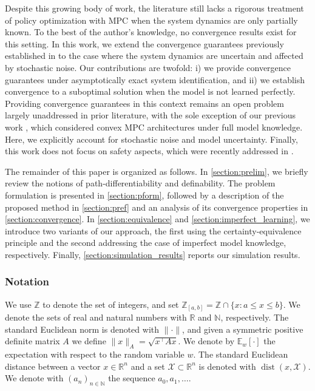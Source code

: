\documentclass[journal,twoside,web,final]{ieeecolor}
\theoremstyle{definition}
\newcommand{\R}{\mathbb{R}}
\newcommand{\Z}{\mathbb{Z}}
\newcommand{\N}{\mathbb{N}}
\begin{document}
Despite this growing body of work, the literature still lacks a rigorous treatment of policy optimization with MPC when the system dynamics are only partially known. To the best of the author's knowledge, no convergence results exist for this setting.
In this work, we extend the convergence guarantees previously established in \cite{zuliani2023bp} to the case where the system dynamics are uncertain and affected by stochastic noise. Our contributions are twofold:
i) we provide convergence guarantees under asymptotically exact system identification, and
ii) we establish convergence to a suboptimal solution when the model is not learned perfectly.
Providing convergence guarantees in this context remains an open problem largely unaddressed in prior literature, with the sole exception of our previous work \cite{zuliani2023bp}, which considered convex MPC architectures under full model knowledge. Here, we explicitly account for stochastic noise and model uncertainty.
Finally, this work does not focus on safety aspects, which were recently addressed in \cite{zuliani2024closed}.

The remainder of this paper is organized as follows. In \cref{section:prelim}, we briefly review the notions of path-differentiability and definability. The problem formulation is presented in \cref{section:pform}, followed by a description of the proposed method in \cref{section:pref} and an analysis of its convergence properties in \cref{section:convergence}. In \cref{section:equivalence} and \cref{section:imperfect_learning}, we introduce two variants of our approach, the first using the certainty-equivalence principle and the second addressing the case of imperfect model knowledge, respectively. Finally, \cref{section:simulation_results} reports our simulation results.

\subsubsection*{Notation}
\label{section:notation}
We use $\Z$ to denote the set of integers, and set $\Z_{[a,b]}= \Z \cap \{ x: a \leq x \leq b \}$. We denote the sets of real and natural numbers with $\R$ and $\N$, respectively. The standard Euclidean norm is denoted with $\|\cdot\|$, and given a symmetric positive definite matrix $A$ we define $\|x\|_A = \sqrt{x^\top A x}$. We denote by $\mathbb{E}_w[\cdot]$ the expectation with respect to the random variable $w$. The standard Euclidean distance between a vector $x\in \R^n$ and a set $\mathcal{X} \subset \R^n$ is denoted with $\operatorname*{dist}(x,\mathcal{X})$. We denote with $(a_n)_{n\in\N}$ the sequence $a_0,a_1,\dots$.
\end{document}
